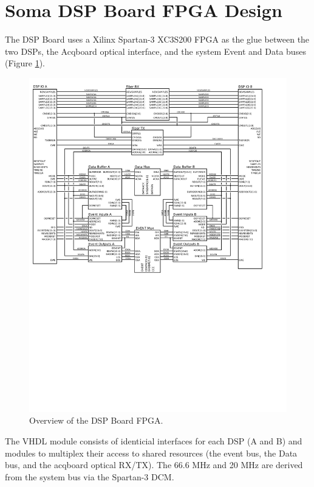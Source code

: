 \section{Soma DSP Board FPGA Design}


The DSP Board uses a Xilinx Spartan-3 XC3S200 FPGA as the glue between
the two DSPs, the Acqboard optical interface, and the system Event and
Data buses (Figure \ref{DSPboard.FPGA}).
  
\begin{figure}[h!]
\includegraphics[scale=0.8]{FPGAOverview.svg}
\caption{Overview of the DSP Board FPGA.}
\label{DSPboard.FPGA}
\end{figure}
  
The VHDL module consists of identicial interfaces for each DSP (A and
B) and modules to multiplex their access to shared resources (the
event bus, the Data bus, and the acqboard optical RX/TX). The 66.6 MHz
 and 20 MHz  are derived from the system
bus  via the Spartan-3 DCM.


